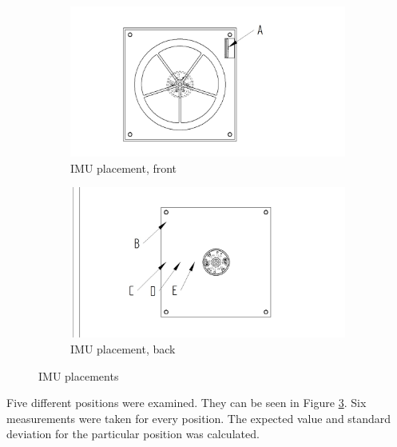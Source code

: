 \documentclass[a4paper,11pt]{kth-mag}
\begin{document}
\begin{figure}
\centering
\begin{subfigure}{.48\textwidth}
  \centering
  \includegraphics[trim=0.3cm 0.1cm 0.8cm 0.2cm, clip=true, width=\textwidth]{framsidaIMUpunkter.jpg}
  \caption{IMU placement, front}
  \label{Fig: IMU placement front}
\end{subfigure}
\begin{subfigure}{.48\textwidth}
  \centering
  \includegraphics[trim=0.6cm 0.15cm 0.5cm 0.2cm, clip=true, width=\textwidth]{baksidaIMUpunkter.jpg}
  \caption{IMU placement, back}
  \label{Fig: IMU placement back}
\end{subfigure}
\caption{IMU placements}
\label{Fig: IMU placement}
\end{figure}

Five different positions were examined. They can be seen in Figure \ref{Fig: IMU placement}. Six measurements were taken for every position. The expected value and standard deviation for the particular position was calculated.

\end{document}
